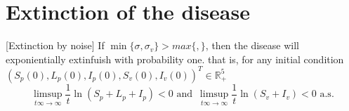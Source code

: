 \section{Extinction of the disease}

\begin{theorem}\label{theorem_noise}[Extinction by noise]
	If $\min\{\sigma,\sigma_v\} > max\{,\}$, then the disease will exponientially extinfuish with probability one. that is, for any initial condition $(S_p(0),L_p(0),I_p(0),S_v(0),I_v(0))^T\in \mathbb{R}_+^5$
	\begin{equation*}
		\limsup_{t\infty \rightarrow \infty}\frac{1}{t}\ln(S_p+L_p+I_p)< 0\,\, \mbox{and}\,\,\, \limsup_{t\infty \rightarrow \infty}\frac{1}{t}\ln(S_v+I_v)< 0\,\,\mbox{a.s.}
	\end{equation*}
\end{theorem}
